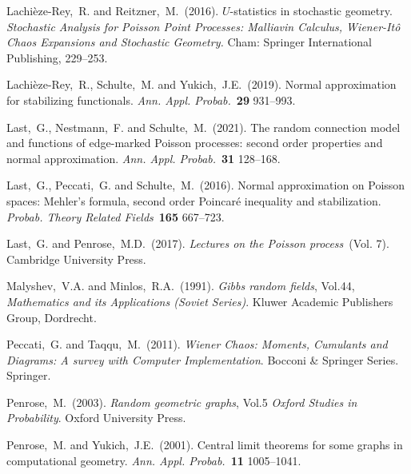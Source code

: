 \documentclass[bj,authoryear,noshowframe]{imsart}
\theoremstyle{plain}
\theoremstyle{remark}
\begin{document}
\begin{thebibliography}{4}
  Lachi\`eze-Rey,~R. and Reitzner,~M.~(2016).
  $U$-statistics in stochastic geometry.
  {\em Stochastic Analysis for {P}oisson Point Processes: {M}alliavin Calculus, {W}iener-{I}t{\^o} Chaos Expansions and Stochastic Geometry.} Cham: Springer International Publishing, 229--253.

  Lachi\`eze-Rey,~R., Schulte,~M. and Yukich,~J.E.~(2019).
  Normal approximation for stabilizing functionals.
  \textit{Ann. Appl. Probab.}~\textbf{29} 931--993.

  Last,~G., Nestmann,~F. and Schulte,~M.~(2021).
  The random connection model and functions of edge-marked {P}oisson processes: second order properties and normal approximation.
  \textit{Ann. Appl. Probab.}~\textbf{31} 128--168.

  Last,~G., Peccati,~G. and Schulte,~M.~(2016).
  Normal approximation on Poisson spaces: Mehler's formula, second order Poincar\'e inequality and stabilization.
  \textit{Probab. Theory Related Fields}~\textbf{165} 667--723.

  Last,~G. and Penrose,~M.D.~(2017).
  \textit{Lectures on the Poisson process}~(Vol. 7).
  Cambridge University Press.

  Malyshev,~V.A. and Minlos,~R.A.~(1991).
  \textit{Gibbs random fields}, Vol.44, {\em Mathematics and its Applications (Soviet Series)}.
  \newblock Kluwer Academic Publishers Group, Dordrecht.

  Peccati,~G. and Taqqu,~M.~(2011).
  \textit{Wiener Chaos: Moments, Cumulants and Diagrams: A survey with Computer Implementation}.
  \newblock Bocconi \& Springer Series. Springer.

  Penrose,~M.~(2003).
  \textit{Random geometric graphs}, Vol.5 {\em Oxford Studies in Probability}.
  \newblock Oxford University Press.

  


  Penrose,~M. and Yukich,~J.E.~(2001).
  Central limit theorems for some graphs in computational geometry.
  \textit{Ann. Appl. Probab.}~\textbf{11} 1005--1041.


\end{thebibliography}
\end{document}
